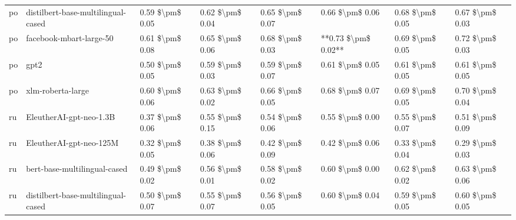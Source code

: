 \begin{tabular}{llllllll}
      po & distilbert-base-multilingual-cased & 0.59 \$\textbackslash pm\$ 0.05 &           0.62 \$\textbackslash pm\$ 0.04 &       0.65 \$\textbackslash pm\$ 0.07 &        0.66 \$\textbackslash pm\$ 0.06 &                         0.68 \$\textbackslash pm\$ 0.05 &     0.67 \$\textbackslash pm\$ 0.03 \\
      po &            facebook-mbart-large-50 & 0.61 \$\textbackslash pm\$ 0.08 &           0.65 \$\textbackslash pm\$ 0.06 &       0.68 \$\textbackslash pm\$ 0.03 &    **0.73 \$\textbackslash pm\$ 0.02** &                         0.69 \$\textbackslash pm\$ 0.05 &     0.72 \$\textbackslash pm\$ 0.03 \\
      po &                               gpt2 & 0.50 \$\textbackslash pm\$ 0.05 &           0.59 \$\textbackslash pm\$ 0.03 &       0.59 \$\textbackslash pm\$ 0.07 &        0.61 \$\textbackslash pm\$ 0.05 &                         0.61 \$\textbackslash pm\$ 0.05 &     0.61 \$\textbackslash pm\$ 0.05 \\
      po &                  xlm-roberta-large & 0.60 \$\textbackslash pm\$ 0.06 &           0.63 \$\textbackslash pm\$ 0.02 &       0.66 \$\textbackslash pm\$ 0.05 &        0.68 \$\textbackslash pm\$ 0.07 &                         0.69 \$\textbackslash pm\$ 0.05 &     0.70 \$\textbackslash pm\$ 0.04 \\
      ru &            EleutherAI-gpt-neo-1.3B & 0.37 \$\textbackslash pm\$ 0.06 &           0.55 \$\textbackslash pm\$ 0.15 &       0.54 \$\textbackslash pm\$ 0.06 &        0.55 \$\textbackslash pm\$ 0.00 &                         0.55 \$\textbackslash pm\$ 0.07 &     0.51 \$\textbackslash pm\$ 0.09 \\
      ru &            EleutherAI-gpt-neo-125M & 0.32 \$\textbackslash pm\$ 0.05 &           0.38 \$\textbackslash pm\$ 0.06 &       0.42 \$\textbackslash pm\$ 0.09 &        0.42 \$\textbackslash pm\$ 0.06 &                         0.33 \$\textbackslash pm\$ 0.04 &     0.29 \$\textbackslash pm\$ 0.03 \\
      ru &       bert-base-multilingual-cased & 0.49 \$\textbackslash pm\$ 0.02 &           0.56 \$\textbackslash pm\$ 0.01 &       0.58 \$\textbackslash pm\$ 0.02 &        0.60 \$\textbackslash pm\$ 0.00 &                         0.62 \$\textbackslash pm\$ 0.02 &     0.63 \$\textbackslash pm\$ 0.06 \\
      ru & distilbert-base-multilingual-cased & 0.50 \$\textbackslash pm\$ 0.07 &           0.55 \$\textbackslash pm\$ 0.07 &       0.56 \$\textbackslash pm\$ 0.05 &        0.60 \$\textbackslash pm\$ 0.04 &                         0.59 \$\textbackslash pm\$ 0.05 &     0.60 \$\textbackslash pm\$ 0.05 \\

\end{tabular}
